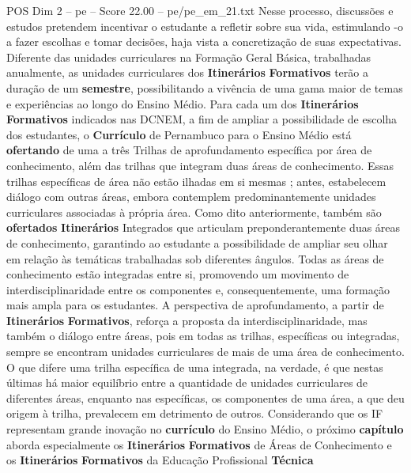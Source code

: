 \begin{textsample}{POS Dim 2 – pe – Score 22.00 – pe/pe\_em\_21.txt}
Nesse processo, discussões e estudos pretendem incentivar o estudante a refletir sobre sua vida, estimulando -o a fazer escolhas e tomar decisões, haja vista a concretização de suas expectativas.
Diferente das unidades curriculares na Formação Geral Básica, trabalhadas anualmente, as unidades curriculares dos \textbf{Itinerários} \textbf{Formativos} terão a duração de um \textbf{semestre}, possibilitando a vivência de uma gama maior de temas e experiências ao longo do Ensino Médio.
Para cada um dos \textbf{Itinerários} \textbf{Formativos} indicados nas DCNEM, a fim de ampliar a possibilidade de escolha dos estudantes, o \textbf{Currículo} de Pernambuco para o Ensino Médio está \textbf{ofertando} de uma a três Trilhas de aprofundamento específica por área de conhecimento, além das trilhas que integram duas áreas de conhecimento.
Essas trilhas específicas de área não estão ilhadas em si mesmas ; antes, estabelecem diálogo com outras áreas, embora contemplem predominantemente unidades curriculares associadas à própria área.
Como dito anteriormente, também são \textbf{ofertados} \textbf{Itinerários} Integrados que articulam preponderantemente duas áreas de conhecimento, garantindo ao estudante a possibilidade de ampliar seu olhar em relação às temáticas trabalhadas sob diferentes ângulos.
Todas as áreas de conhecimento estão integradas entre si, promovendo um movimento de interdisciplinaridade entre os componentes e, consequentemente, uma formação mais ampla para os estudantes.
A perspectiva de aprofundamento, a partir de \textbf{Itinerários} \textbf{Formativos}, reforça a proposta da interdisciplinaridade, mas também o diálogo entre áreas, pois em todas as trilhas, específicas ou integradas, sempre se encontram unidades curriculares de mais de uma área de conhecimento.
O que difere uma trilha específica de uma integrada, na verdade, é que nestas últimas há maior equilíbrio entre a quantidade de unidades curriculares de diferentes áreas, enquanto nas específicas, os componentes de uma área, a que deu origem à trilha, prevalecem em detrimento de outros.
Considerando que os IF representam grande inovação no \textbf{currículo} do Ensino Médio, o próximo \textbf{capítulo} aborda especialmente os \textbf{Itinerários} \textbf{Formativos} de Áreas de Conhecimento e os \textbf{Itinerários} \textbf{Formativos} da Educação Profissional \textbf{Técnica}

\end{textsample}
